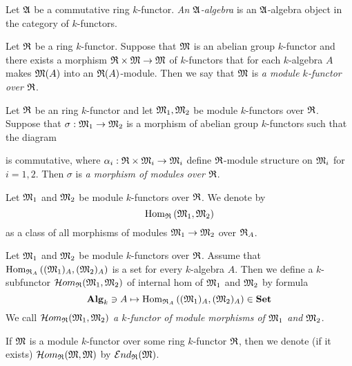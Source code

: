 \begin{definition}
Let ${\mathfrak A}$ be a commutative ring $k$-functor. \textit{An ${\mathfrak A}$-algebra} is an ${\mathfrak A}$-algebra object in the category of $k$-functors.
\end{definition}

\begin{definition}
Let ${\mathfrak R}$ be a ring $k$-functor. Suppose that ${\mathfrak M}$ is an abelian group $k$-functor and there exists a morphism ${\mathfrak R} \times {\mathfrak M}\rightarrow {\mathfrak M}$ of $k$-functors that for each $k$-algebra $A$ makes ${\mathfrak M}(A)$ into an ${\mathfrak R}(A)$-module. Then we say that ${\mathfrak M}$ is \textit{a module $k$-functor over ${\mathfrak R}$}.
\end{definition}

\begin{definition}
Let ${\mathfrak R}$ be an ring $k$-functor and let ${\mathfrak M}_1,{\mathfrak M}_2$ be module $k$-functors over ${\mathfrak R}$. Suppose that $\sigma:{\mathfrak M}_1\rightarrow {\mathfrak M}_2$ is a morphism of abelian group $k$-functors such that the diagram
\begin{center}
\end{center}
is commutative, where $\alpha_i:{\mathfrak R}\times {\mathfrak M}_i\rightarrow {\mathfrak M}_i$ define ${\mathfrak R}$-module structure on ${\mathfrak M}_i$ for $i=1,2$. Then $\sigma$ is \textit{a morphism of modules over ${\mathfrak R}$}.
\end{definition}
\noindent
Let ${\mathfrak M}_1$ and ${\mathfrak M}_2$ be module $k$-functors over ${\mathfrak R}$. We denote by
$$\mathrm{Hom}_{{\mathfrak R}}\left({\mathfrak M}_1,{\mathfrak M}_2\right)$$
as a class of all morphisms of modules ${\mathfrak M}_1\rightarrow {\mathfrak M}_2$ over ${\mathfrak R}_A$.

\begin{definition}
Let ${\mathfrak M}_1$ and ${\mathfrak M}_2$ be module $k$-functors over ${\mathfrak R}$. Assume that $\mathrm{Hom}_{{\mathfrak R}_A}\left(({\mathfrak M}_1)_A,({\mathfrak M}_2)_A\right)$ is a set for every $k$-algebra $A$. Then we define a $k$-subfunctor ${\mathcal H}om_{{\mathfrak R}}({\mathfrak M}_1,{\mathfrak M}_2)$ of internal hom of ${\mathfrak M}_1$ and ${\mathfrak M}_2$ by formula
$$\mathbf{Alg}_k\ni A \mapsto \mathrm{Hom}_{{\mathfrak R}_A}\left(({\mathfrak M}_1)_A,({\mathfrak M}_2)_A\right) \in \mathbf{Set}$$
We call ${\mathcal H}om_{{\mathfrak R}}({\mathfrak M}_1,{\mathfrak M}_2)$ \textit{a $k$-functor of module morphisms of ${\mathfrak M}_1$ and ${\mathfrak M}_2$}.
\end{definition}
\noindent
If ${\mathfrak M}$ is a module $k$-functor over some ring $k$-functor ${\mathfrak R}$, then we denote (if it exists) ${\mathcal H}om_{{\mathfrak R}}({\mathfrak M},{\mathfrak M})$ by ${\mathcal E} nd_{{\mathfrak R}}({\mathfrak M})$.

